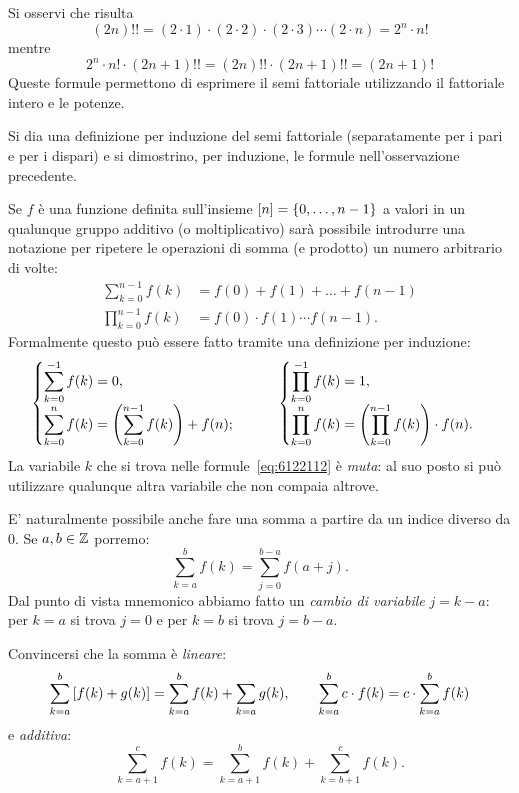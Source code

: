   \begin{remark}
  \label{rem:doppio_fattoriale}%
  Si osservi che risulta
  \[
    (2n)!! = (2\cdot 1) \cdot (2\cdot 2) \cdot (2\cdot 3) \cdots (2\cdot n)
          = 2^n \cdot n!
  \]
  mentre
  \[
    2^n \cdot n! \cdot (2n+1)!! 
    = (2n)!! \cdot (2n+1)!!
    = (2n+1)!
  \]
  Queste formule permettono di esprimere il semi fattoriale utilizzando
  il fattoriale intero e le potenze.
  \end{remark}
  
\begin{exercise}
  Si dia una definizione per induzione del semi fattoriale
  (separatamente per i pari e per i dispari)
  e si dimostrino, per induzione, le formule nell'osservazione precedente.
\end{exercise}

Se $f$ è una funzione definita sull'insieme ${\left[ n \right]} = {\left\{ 0,\dots,n-1 \right\}}$ 
a valori in un qualunque gruppo additivo (o moltiplicativo) 
sarà possibile introdurre una notazione per ripetere le operazioni
di somma (e prodotto) un numero arbitrario di volte:
\begin{align}\label{eq:6122112}
  \sum_{k=0}^{n-1} f(k) &= f(0) + f(1) + \dots + f(n-1) \\
  \prod_{k=0}^{n-1} f(k) &= f(0) \cdot f(1) \cdots f(n-1).
\end{align}
Formalmente questo può essere fatto tramite una definizione per induzione:
\[
  \begin{cases}
    \displaystyle\sum_{k=0}^{-1} f(k) = 0, \\
    \displaystyle\sum_{k=0}^{n} f(k) = {\left( \sum_{k=0}^{n-1} f(k) \right)} + f(n);
  \end{cases}  \qquad
  \begin{cases}
    \displaystyle\prod_{k=0}^{-1} f(k) = 1, \\
    \displaystyle\prod_{k=0}^{n} f(k) = {\left( \prod_{k=0}^{n-1} f(k) \right)} \cdot f(n).
  \end{cases}
\]
La variabile $k$ che si trova nelle formule~\eqref{eq:6122112} è \emph{muta}: 
al suo posto si può utilizzare qualunque altra variabile che non
compaia altrove.

E' naturalmente possibile anche fare una somma a partire da un indice 
diverso da $0$. Se $a,b\in \mathbb Z$ porremo:
\[
  \sum_{k=a}^b f(k) = \sum_{j=0}^{b-a} f(a+j).
\]
Dal punto di vista mnemonico abbiamo fatto 
un \emph{cambio di variabile} $j=k-a$:
per $k=a$ si trova $j=0$ e per $k=b$ si trova $j=b-a$.

\begin{exercise}
  Convincersi che la somma è \emph{lineare}:
  \[
  \sum_{k=a}^b  {\left[ f(k) + g(k) \right]} 
  = \sum_{k=a}^b f(k) + \sum_{k=a} g(k), 
  \qquad
  \sum_{k=a}^b c\cdot f(k) 
  =c\cdot \sum_{k=a}^b f(k)
  \]
  e \emph{additiva}:
  \[
    \sum_{k=a+1}^c f(k) = \sum_{k=a+1}^b f(k) + \sum_{k=b+1}^c f(k).  
  \]
\end{exercise}

